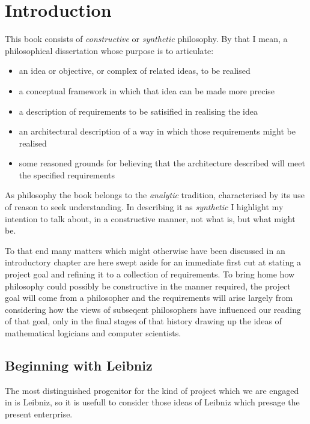 
\chapter{Introduction}\label{IntroductionA}


This book consists of {\it constructive} or {\it synthetic} philosophy.
By that I mean, a philosophical dissertation whose purpose is to articulate:

\begin{itemize}
\item an idea or objective, or complex of related ideas, to be realised
\item a conceptual framework in which that idea can be made more precise
\item a description of requirements to be satisified in realising the idea
\item an architectural description of a way in which those requirements might be realised
\item some reasoned grounds for believing that the architecture described will meet the specified requirements
\end{itemize}

As philosophy the book belongs to the {\it analytic} tradition, characterised by its use of reason to seek understanding.
In describing it as {\it synthetic} I highlight my intention to talk about, in a constructive manner, not what is, but what might be.

To that end many matters which might otherwise have been discussed in an introductory chapter are here swept aside for an immediate first cut at stating a project goal and refining it to a collection of requirements.
To bring home how philosophy could possibly be constructive in the manner required, the project goal will come from a philosopher and the requirements will arise largely from considering how the views of subseqent philosophers have influenced our reading of that goal, only in the final stages of that history drawing up the ideas of mathematical logicians and computer scientists.

\section{Beginning with Leibniz}

The most distinguished progenitor for the kind of project which we are engaged in is Leibniz, so it is usefull to consider those ideas of Leibniz which presage the present enterprise.

